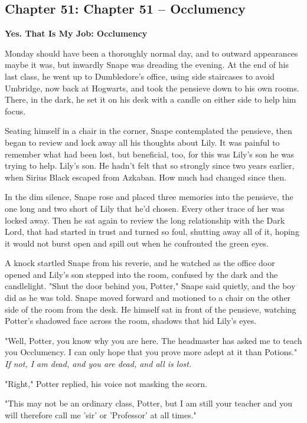 \documentclass[a4paper,11pt]{article}
\begin{document}
\subsection{Chapter 51: Chapter 51 – Occlumency}

\textbf{Yes. That Is My Job: Occlumency}

Monday should have been a thoroughly normal day, and to outward appearances maybe it was, but inwardly Snape was dreading the evening. At the end of his last class, he went up to Dumbledore's office, using side staircases to avoid Umbridge, now back at Hogwarts, and took the pensieve down to his own rooms. There, in the dark, he set it on his desk with a candle on either side to help him focus.

Seating himself in a chair in the corner, Snape contemplated the pensieve, then began to review and lock away all his thoughts about Lily. It was painful to remember what had been lost, but beneficial, too, for this was Lily's son he was trying to help. Lily's son. He hadn't felt that so strongly since two years earlier, when Sirius Black escaped from Azkaban. How much had changed since then.

In the dim silence, Snape rose and placed three memories into the pensieve, the one long and two short of Lily that he'd chosen. Every other trace of her was locked away. Then he sat again to review the long relationship with the Dark Lord, that had started in trust and turned so foul, shutting away all of it, hoping it would not burst open and spill out when he confronted the green eyes.

A knock startled Snape from his reverie, and he watched as the office door opened and Lily's son stepped into the room, confused by the dark and the candlelight. "Shut the door behind you, Potter," Snape said quietly, and the boy did as he was told. Snape moved forward and motioned to a chair on the other side of the room from the desk. He himself sat in front of the pensieve, watching Potter's shadowed face across the room, shadows that hid Lily's eyes.

"Well, Potter, you know why you are here. The headmaster has asked me to teach you Occlumency. I can only hope that you prove more adept at it than Potions." \emph{If not, I am dead, and you are dead, and all is lost.}

"Right," Potter replied, his voice not masking the scorn.

"This may not be an ordinary class, Potter, but I am still your teacher and you will therefore call me 'sir' or 'Professor' at all times."
\end{document}
